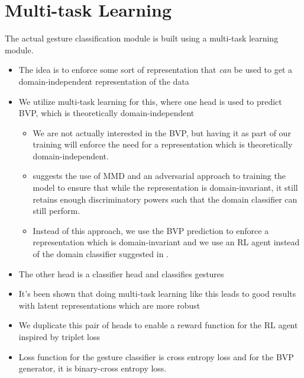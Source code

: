 \section{Multi-task Learning}\label{sec:methodology-multi-task-learning}

The actual gesture classification module is built using a multi-task learning module.

\begin{itemize}
	\item The idea is to enforce some sort of representation that \textit{can} be used to get a domain-independent representation of the data
	\item We utilize multi-task learning for this, where one head is used to predict BVP, which is theoretically domain-independent \cite{zheng2019zero}
	\begin{itemize}
		\item We are not actually interested in the BVP, but having it as part of our training will enforce the need for a representation which is theoretically domain-independent.
		\item \cite{martini2021domain} suggests the use of MMD and an adversarial approach to training the model to ensure that while the representation is domain-invariant, it still retains enough discriminatory powers such that the domain classifier can still perform.
		\item Instead of this approach, we use the BVP prediction to enforce a representation which is domain-invariant and we use an RL agent instead of the domain classifier suggested in \cite{martini2021domain}.
	\end{itemize}
	\item The other head is a classifier head and classifies gestures
	\item It's been shown that doing multi-task learning like this leads to good results with latent representations which are more robust \cite{tuggener2021deepscoresv2}
	\item We duplicate this pair of heads to enable a reward function for the RL agent inspired by triplet loss
	\item Loss function for the gesture classifier is cross entropy loss and for the BVP generator, it is binary-cross entropy loss.
\end{itemize}
